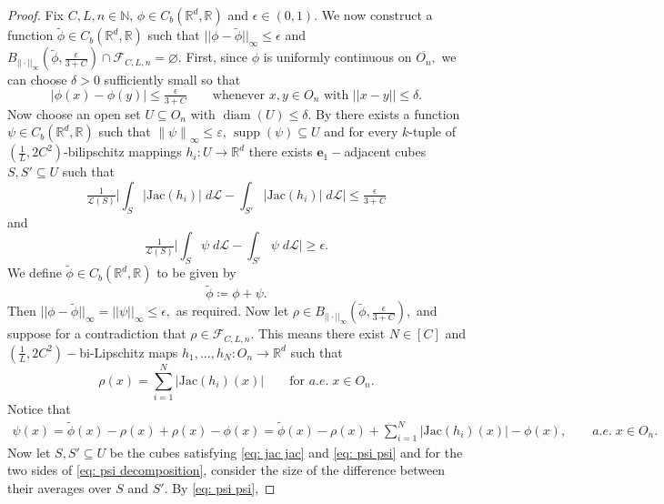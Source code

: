 \documentclass{article}
\newcommand{\R}{\mathbb{R}}
\newcommand{\N}{\mathbb{N}}
\newcommand{\leb}{\mc{L}}
\DeclareMathOperator{\diam}{diam}
\newcommand{\infnorm}[1]{\left\|#1\right\|_\infty}
\newcommand{\mc}[1]{\mathcal{#1}}
\begin{document}
\begin{proof}
Fix $C,L,n \in \N$, $\phi \in C_b(\R^d, \R)$ and $\epsilon \in (0,1).$ We now construct a function $\widetilde{\phi} \in C_b(\R^d,\R)$ such that $||\phi - \widetilde{\phi}||_{\infty} \leq \epsilon$ and $B_{||\cdot||_{\infty}}(\widetilde{\phi}, \frac{\epsilon}{3+C}) \cap \mathcal{F}_{C,L,n} = \varnothing$. First, since $\phi$ is uniformly continuous on $\overline{O_n},$ we can choose $\delta>0$ sufficiently small so that  
\begin{equation} \label{eq: uniform continuity}
    |\phi(x)-\phi(y)| \leq \tfrac{\epsilon}{3+C} \qquad \text{whenever $x,y \in O_n$ with $||x-y|| \leq \delta$}.
\end{equation}
Now choose an open set $U \subseteq O_n$ with $\diam(U) \leq \delta.$
By \cite[Lemma~4.6]{dymond2018mapping} there exists a function $\psi\in C_{b}(\R^{d},\R)$ such that $\infnorm{\psi}\leq \varepsilon$, $\operatorname{supp}(\psi)\subseteq U$ and for every $k$-tuple of $(\tfrac{1}{L},2C^2)$-bilipschitz mappings $h_{i}\colon U\to \R^{d}$ there exists $\mathbf{e}_1-$adjacent cubes $S,S' \subseteq U$ such that
    \begin{equation} \label{eq: jac jac}
        \tfrac{1}{\leb(S)}\bigg|\int_S |\text{Jac}(h_i)| \; d\leb - \int_{S'}|\text{Jac}(h_i)| \; d \leb \bigg| \leq \tfrac{\epsilon}{3+C}
    \end{equation} and
    \begin{equation} \label{eq: psi psi}
        \tfrac{1}{\leb(S)}\bigg|\int_S \psi\; d \leb - \int_{S'}\psi \; d \leb\bigg| \geq \epsilon.
    \end{equation} 
We define $\widetilde{\phi} \in C_b(\R^d, \R)$ to be given by
$$\widetilde{\phi} \coloneqq \phi + \psi.$$
Then $||\phi - \widetilde{\phi}||_{\infty} = ||\psi||_{\infty} \leq \epsilon,$ as required. Now let $\rho \in B_{||\cdot||_{\infty}}(\widetilde{\phi},\frac{\epsilon}{3+C}),$ and suppose for a contradiction that $\rho \in \mathcal{F}_{C,L,n}.$ This means there exist $N \in [C]$ and $(\frac{1}{L},2C^2)-$bi-Lipschitz maps $h_1,...,h_N:O_n \to \R^d$ such that 
$$\rho(x) = \sum_{i=1}^N |\text{Jac}(h_i)(x)|\qquad \text{for $a.e. \; x \in O_n$}.$$
Notice that
\begin{equation}\label{eq: psi decomposition}
    \begin{split}
        \psi(x) = \widetilde{\phi}(x)-\rho(x) + \rho(x) - \phi(x) =  \widetilde{\phi}(x)-\rho(x) + \sum_{i=1}^N |\text{Jac}(h_i)(x)| - \phi(x), \qquad a.e.\; x \in O_n.
    \end{split}
\end{equation}  Now let $S,S' \subseteq U$ be the cubes satisfying \eqref{eq: jac jac} and \eqref{eq: psi psi} and for the two sides of \eqref{eq: psi decomposition}, consider the size of the difference between their averages over $S$ and $S'$. By \eqref{eq: psi psi},

\end{proof}
\end{document}
